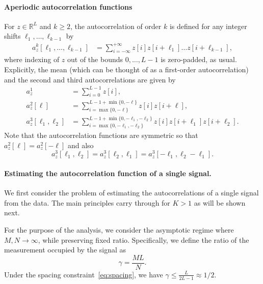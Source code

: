\documentclass[english,11pt]{article}
\newcommand{\1}{\mathbf{1}}
\numberwithin{equation}{section}
\theoremstyle{plain}
\theoremstyle{definition}
\theoremstyle{remark}
\theoremstyle{plain}
\theoremstyle{remark}
\theoremstyle{plain}
\theoremstyle{plain}
\newcommand{\RL}{\mathbb{R}^L}
\begin{document}
\paragraph{Aperiodic autocorrelation functions}
For  
$z\in\RL$ and $k\geq 2$, the autocorrelation of order $k$ is defined for any integer shifts $\ell_1, \ldots, \ell_{k-1}$ by
\begin{align}
	a_z^k[\ell_1,\ldots,\ell_{k-1}]  & = \sum_{i=-\infty}^{+\infty} z[i]z[i+\ell_1]\ldots z[i+\ell_{k-1}],
	\label{eq:ac_general}
\end{align}
where indexing of $z$ out of the bounds $0, \ldots, L-1$ is zero-padded, as usual.
Explicitly, the mean (which can be thought of as a first-order autocorrelation) and the second and third autocorrelations are given by
\begin{align} 
	a_z^1 & = \sum_{i=0}^{L-1} z[i], \nonumber\\
	a_z^2[\ell] & = \sum_{i = \max\{0, -\ell\}}^{L-1 + \min\{0, -\ell\}} z[i]z[i+\ell], \nonumber\\
	a_z^3[\ell_1,\ell_2] & = \sum_{i = \max\{0, -\ell_1, -\ell_2\}}^{L-1 + \min\{0, -\ell_1, -\ell_2\}} z[i]z[i+\ell_1]z[i+\ell_2]. \label{eq:ac_special}
\end{align}
Note that the autocorrelation functions are symmetric so that $a_z^2[\ell] = a_z^2[-\ell]$ and also $$a_z^3[\ell_1,\ell_2] = a_z^3[\ell_2,\ell_1]=a_z^3[-\ell_1,\ell_2-\ell_1].$$

\paragraph{Estimating the autocorrelation function of a single signal.}

We first consider the problem of estimating the autocorrelations of a single signal from the data. 
The main principles carry through for $K>1$ as will be shown next.  

For the purpose of the analysis, we consider  the asymptotic regime where $M,N\to\infty$, while preserving fixed ratio. 
Specifically, we define the ratio of the measurement occupied by  the signal as
\begin{equation}
\gamma = \frac{M L}{N}.
\end{equation}
Under the spacing constraint~\eqref{eq:spacing}, we have $\gamma\leq\frac{L}{2L-1}\approx 1/2$.
\end{document}
